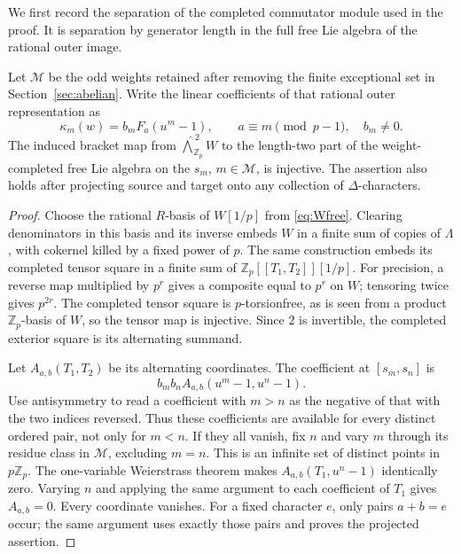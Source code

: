 We first record the separation of the completed commutator module
used in the proof.  It is separation by generator length in the
full free Lie algebra of the rational outer image.

\begin{lemma}\label{lem:class-two-moments}
Let $\mathcal M$ be the odd weights retained after removing the
finite exceptional set in Section~\ref{sec:abelian}.
Write the linear coefficients of that rational outer
representation as
\[
 \kappa_m(w)=b_m F_a(u^m-1),\qquad
 a\equiv m\pmod{p-1},\quad b_m\ne0.
\]
The induced bracket map from
$\widehat{\bigwedge}^{\,2}_{\mathbb Z_p}W$
to the length-two part of the weight-completed free Lie algebra
on the $s_m$, $m\in\mathcal M$, is injective.
The assertion also holds after projecting source and target onto
any collection of $\Delta$-characters.
\end{lemma}

\begin{proof}
Choose the rational $R$-basis of $W[1/p]$ from
\eqref{eq:Wfree}.  Clearing denominators in this basis and its
inverse embeds $W$ in a finite sum of copies of $\Lambda$,
with cokernel killed by a fixed power of $p$.
The same construction embeds its completed tensor square
in a finite sum of $\mathbb Z_p[[T_1,T_2]][1/p]$.
For precision, a reverse map multiplied by $p^r$ gives a
composite equal to $p^r$ on $W$; tensoring twice gives
$p^{2r}$.  The completed tensor square is $p$-torsionfree,
as is seen from a product $\mathbb Z_p$-basis of $W$, so
the tensor map is injective.  Since $2$ is invertible,
the completed exterior square is its alternating summand.

Let $A_{a,b}(T_1,T_2)$ be its alternating coordinates.
The coefficient at $[s_m,s_n]$ is
\[
             b_mb_n A_{a,b}(u^m-1,u^n-1).
\]
Use antisymmetry to read a coefficient with $m>n$ as the
negative of that with the two indices reversed.  Thus these
coefficients are available for every distinct ordered pair,
not only for $m<n$.
If they all vanish, fix $n$ and vary $m$ through its residue
class in $\mathcal M$, excluding $m=n$.  This is an infinite
set of distinct points in $p\mathbb Z_p$.
The one-variable Weierstrass theorem makes
$A_{a,b}(T_1,u^n-1)$ identically zero.  Varying $n$ and
applying the same argument to each coefficient of $T_1$
gives $A_{a,b}=0$.  Every coordinate vanishes.
For a fixed character $e$, only pairs $a+b=e$ occur;
the same argument uses exactly those pairs and proves
the projected assertion.
\end{proof}


